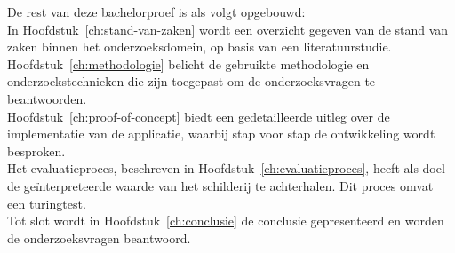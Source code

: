 
De rest van deze bachelorproef is als volgt opgebouwd: \\

In Hoofdstuk~\ref{ch:stand-van-zaken} wordt een overzicht gegeven van de stand van zaken binnen het onderzoeksdomein, op basis van een literatuurstudie. \\ 

Hoofdstuk~\ref{ch:methodologie} belicht de gebruikte methodologie en onderzoekstechnieken die zijn toegepast om de onderzoeksvragen te beantwoorden. \\ 

Hoofdstuk~\ref{ch:proof-of-concept} biedt een gedetailleerde uitleg over de implementatie van de applicatie, waarbij stap voor stap de ontwikkeling wordt besproken. \\ 

Het evaluatieproces, beschreven in Hoofdstuk~\ref{ch:evaluatieproces}, heeft als doel de geïnterpreteerde waarde van het schilderij te achterhalen. Dit proces omvat een turingtest. \\

Tot slot wordt in Hoofdstuk~\ref{ch:conclusie} de conclusie gepresenteerd en worden de onderzoeksvragen beantwoord.